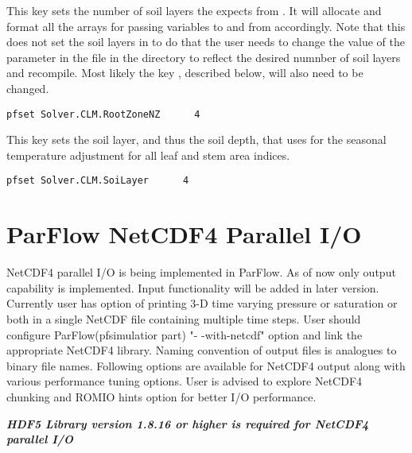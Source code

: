 {This key sets the number of soil layers the \parflow{} expects from .  It will allocate and format all the arrays for passing variables to and from  accordingly.  Note that this does not set the soil layers in  
to do that the user needs to change the value of the parameter  in the file  
 in the  directory to reflect the desired numnber of soil layers and recompile. Most likely the key , described below, will also need to be changed.} 
\begin{display}\begin{verbatim}
pfset Solver.CLM.RootZoneNZ      4
\end{verbatim}\end{display}

{This key sets the soil layer, and thus the soil depth, that  uses for the seasonal temperature adjustment for all leaf and stem area indices.} 
\begin{display}\begin{verbatim}
pfset Solver.CLM.SoiLayer      4
\end{verbatim}\end{display}


\section{ParFlow NetCDF4 Parallel I/O}
\label{ParFlow NetCDF4 Parallel I/O}
NetCDF4 parallel I/O is being implemented in ParFlow. As of now only output capability is implemented. Input functionality will be added in later version. Currently user has option of printing 3-D time varying pressure or saturation or both in a single NetCDF file containing multiple time steps. User should configure ParFlow(pfsimulatior part) "- -with-netcdf" option and link the appropriate NetCDF4 library.
Naming convention of output files is analogues to binary file names. Following options are available for NetCDF4 output along with various performance tuning options. User is advised to explore NetCDF4 chunking and ROMIO hints option for better I/O performance.

\textbf{\textit{HDF5 Library version 1.8.16 or higher is required for NetCDF4 parallel I/O}}

